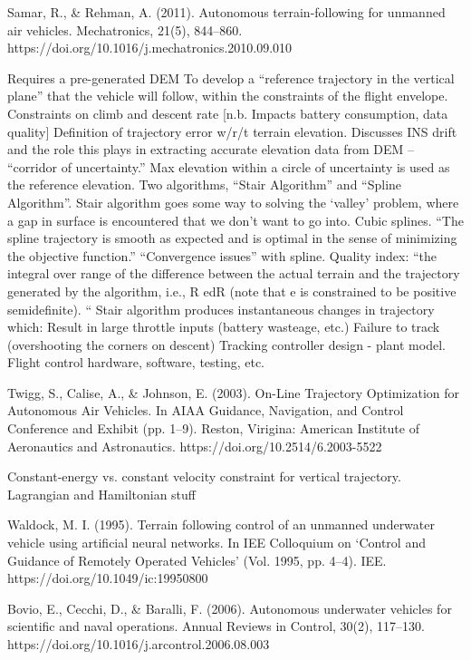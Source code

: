 \cite{Samar2011}
Samar, R., \& Rehman, A. (2011). Autonomous terrain-following for unmanned air vehicles. Mechatronics, 21(5), 844–860. https://doi.org/10.1016/j.mechatronics.2010.09.010

Requires a pre-generated DEM
To develop a “reference trajectory in the vertical plane” that the vehicle will follow, within the constraints of the flight envelope.
Constraints on climb and descent rate [n.b. Impacts battery consumption, data quality]
Definition of trajectory error w/r/t terrain elevation.
Discusses INS drift and the role this plays in extracting accurate elevation data from DEM -- “corridor of uncertainty.”
Max elevation within a circle of uncertainty is used as the reference elevation.
Two algorithms, “Stair Algorithm” and “Spline Algorithm”.
Stair algorithm goes some way to solving the ‘valley’ problem, where a gap in surface is encountered that we don’t want to go into.
Cubic splines.
“The spline trajectory is smooth as expected and is optimal in the sense of minimizing the objective function.”
“Convergence issues” with spline.
Quality index: “the integral over range of the difference between the actual terrain and the trajectory generated by the algorithm, i.e., R edR (note that e is constrained to be positive semidefinite). “
Stair algorithm produces instantaneous changes in trajectory which:
Result in large throttle inputs (battery wasteage, etc.)
Failure to track (overshooting the corners on descent)
Tracking controller design - plant model.
Flight control hardware, software, testing, etc.

\cite{Twigg2003}
Twigg, S., Calise, A., \& Johnson, E. (2003). On-Line Trajectory Optimization for Autonomous Air Vehicles. In AIAA Guidance, Navigation, and Control Conference and Exhibit (pp. 1–9). Reston, Virigina: American Institute of Aeronautics and Astronautics. https://doi.org/10.2514/6.2003-5522

Constant-energy vs. constant velocity constraint for vertical trajectory.
Lagrangian and Hamiltonian stuff

\cite{Waldock1995}
Waldock, M. I. (1995). Terrain following control of an unmanned underwater vehicle using artificial neural networks. In IEE Colloquium on `Control and Guidance of Remotely Operated Vehicles’ (Vol. 1995, pp. 4–4). IEE. https://doi.org/10.1049/ic:19950800

\cite{Bovio2006}
Bovio, E., Cecchi, D., \& Baralli, F. (2006). Autonomous underwater vehicles for scientific and naval operations. Annual Reviews in Control, 30(2), 117–130. https://doi.org/10.1016/j.arcontrol.2006.08.003

